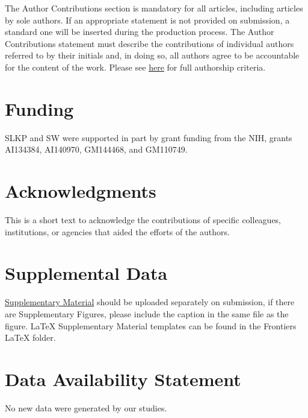 \documentclass[utf8]{FrontiersinHarvard} %
\begin{document}
The Author Contributions section is mandatory for all articles, including
articles by sole authors. If an appropriate statement is not provided on
submission, a standard one will be inserted during the production process. The
Author Contributions statement must describe the contributions of individual
authors referred to by their initials and, in doing so, all authors agree to be
accountable for the content of the work. Please see
\href{https://www.frontiersin.org/guidelines/policies-and-publication-ethics#authorship-and-author-responsibilities}{here}
for full authorship criteria.

\section*{Funding}
SLKP and SW were supported in part by grant funding from the NIH, grants AI134384, AI140970, GM144468, and GM110749.

\section*{Acknowledgments}
This is a short text to acknowledge the contributions of specific colleagues, institutions, or agencies that aided the efforts of the authors.

\section*{Supplemental Data}
\href{https://www.frontiersin.org/guidelines/author-guidelines#supplementary-material}{Supplementary Material} should be uploaded separately on submission, if there are Supplementary Figures, please include the caption in the same file as the figure. LaTeX Supplementary Material templates can be found in the Frontiers LaTeX folder.

\section*{Data Availability Statement}

No new data were generated by our studies.


\nocite{*}
\end{document}
